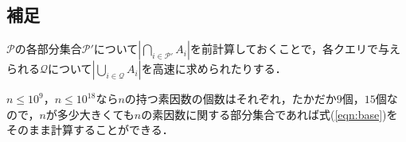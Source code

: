 \documentclass{jsarticle}
\begin{document}

\subsection{補足}
$\mathcal{P}$の各部分集合$\mathcal{P}'$について$\left|\bigcap_{i\in\mathcal{P}'} A_i\right|$を前計算しておくことで，各クエリで与えられる$\mathcal{Q}$について$\left|\bigcup_{i\in\mathcal{Q}} A_i\right|$を高速に求められたりする．

$n\le 10^9$，$n\le 10^{18}$なら$n$の持つ素因数の個数はそれぞれ，たかだか$9$個，$15$個なので，$n$が多少大きくても$n$の素因数に関する部分集合であれば式(\ref{eqn:base})をそのまま計算することができる．
\end{document}
